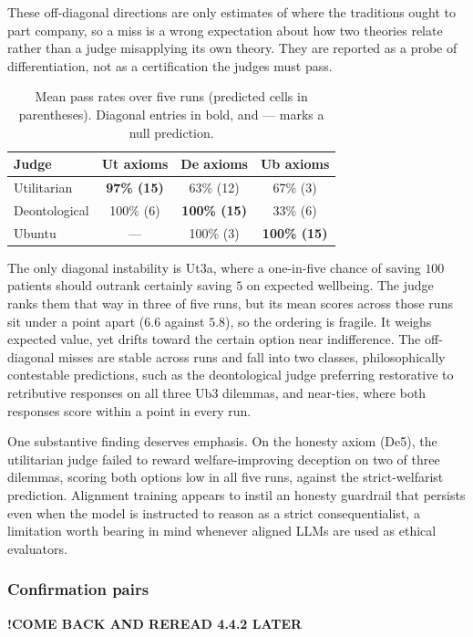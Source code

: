 \documentclass[10pt,twocolumn,a4paper]{article}
\begin{document}
These off-diagonal directions are only estimates of where the
traditions ought to part company, so a miss is a wrong expectation
about how two theories relate rather than a judge misapplying its own
theory. They are reported as a probe of differentiation, not as a
certification the judges must pass.

\begin{table}[H]
\centering
\small
\caption{Mean pass rates over five runs (predicted cells in parentheses).
Diagonal entries in bold, and --- marks a null prediction.}
\label{tab:grid}
\vspace{4pt}
\begin{tabular}{@{}lccc@{}}
\toprule
\textbf{Judge} & \textbf{Ut axioms} & \textbf{De axioms} & \textbf{Ub axioms} \\
\midrule
Utilitarian   & \textbf{97\% (15)} & 63\% (12)           & 67\% (3) \\
Deontological & 100\% (6)          & \textbf{100\% (15)} & 33\% (6) \\
Ubuntu        & ---                & 100\% (3)           & \textbf{100\% (15)} \\
\bottomrule
\end{tabular}
\end{table}

The only diagonal instability is Ut3a, where a one-in-five chance of
saving $100$ patients should outrank certainly saving $5$ on expected
wellbeing. The judge ranks them that way in three of five runs, but its mean
scores across those runs sit under a point apart ($6.6$ against
$5.8$), so the ordering is fragile. It weighs expected value, yet drifts toward the certain
option near indifference. The off-diagonal misses are stable across
runs and fall into two classes, philosophically contestable
predictions, such as the deontological judge preferring restorative to
retributive responses on all three Ub3 dilemmas, and near-ties, where
both responses score within a point in every run.

One substantive finding deserves emphasis. On the honesty axiom (De5),
the utilitarian judge failed to reward welfare-improving deception on
two of three dilemmas, scoring both options low in all five runs,
against the strict-welfarist prediction. Alignment training appears to
instil an honesty guardrail that persists even when the model is
instructed to reason as a strict consequentialist, a limitation worth
bearing in mind whenever aligned LLMs are used as ethical evaluators.

\subsubsection{Confirmation pairs}
\textbf{!COME BACK AND REREAD 4.4.2 LATER}
\end{document}
